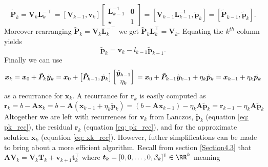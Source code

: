 \[
    \tilde{\bm{P}}_{k} = \bm{V}_{k} \bm{L}_k^{-\intercal} = \left[ \bm{V}_{k-1} , \bm{v}_k \right]
    \begin{bmatrix}
        \bm{L}_{k-1}^{-1} & \bm{0} \\
        \star             & 1
    \end{bmatrix}
    = \left[ \bm{V}_{k-1} \bm{L}_{k-1}^{-1} , \tilde{\bm{p}}_{k} \right]
    = \left[ \tilde{\bm{P}}_{k-1} , \tilde{\bm{p}}_{k} \right].
\]
Moreover rearranging $\tilde{\bm{P}}_{k} = \bm{V}_{k} \bm{L}_k^{-\intercal}$ we get $\tilde{\bm{P}}_{k} \bm{L}_k^{\intercal} = \bm{V}_{k}$. Equating the $k^{th}$ column yields
\begin{equation} \label{eq: pk_rec}
    \tilde{\bm{p}}_{k} = \bm{v}_k - l_{k-1} \tilde{\bm{p}}_{k-1}.
\end{equation}
Finally we can use
\begin{equation} \label{eq: xk_rec}
    \bm{x}_k = \bm{x}_0 + \tilde{\bm{P}}_{k} \tilde{\bm{y}}_{k}                                 \\
    = \bm{x}_0 + \left[ \tilde{\bm{P}}_{k-1} , \tilde{\bm{p}}_{k} \right]
    \begin{bmatrix}
        \tilde{\bm{y}}_{k-1} \\
        \eta_k
    \end{bmatrix}                                                                    \\
    = \bm{x}_0 + \tilde{\bm{P}}_{k-1} \tilde{\bm{y}}_{k-1} + \eta_k \tilde{\bm{p}}_{k} \\
    = \bm{x}_{k-1} + \eta_k \tilde{\bm{p}}_{k}
\end{equation}
as a recurrance for $\bm{x}_k$. A recurrance for $\bm{r}_k$ is easily computed as
\begin{equation} \label{eq: rk_rec}
    \bm{r}_{k} = b - \bm{A} \bm{x}_k = b - \bm{A} \left( \bm{x}_{k-1} + \eta_k \tilde{\bm{p}}_{k} \right) = \left( b - \bm{A} \bm{x}_{k-1} \right) - \eta_k \bm{A} \tilde{\bm{p}}_{k} = \bm{r}_{k-1} - \eta_k \bm{A} \tilde{\bm{p}}_{k}
\end{equation}
Altogether we are left with recurrences for $\bm{v}_k$ from Lanczos, $\tilde{\bm{p}}_{k}$ (equation \ref{eq: pk_rec}), the residual $\bm{r}_k$ (equation \ref{eq: pk_rec}),  and for the approximate solution $\bm{x}_k$ (equation \ref{eq: xk_rec}). However, futher simplifications can be made to bring about a more efficient algorithm. Recall from section \ref{Section4.3} that $\bm{A} \bm{V}_{k} =  \bm{V}_{k} \bm{T}_k + \bm{v}_{k+1} \bm{t}_{k}^{\intercal}$ where $\bm{t}_k = \left[ 0,0, \ldots , 0, \beta_k \right]^{\intercal} \in \RR^k$ meaning
